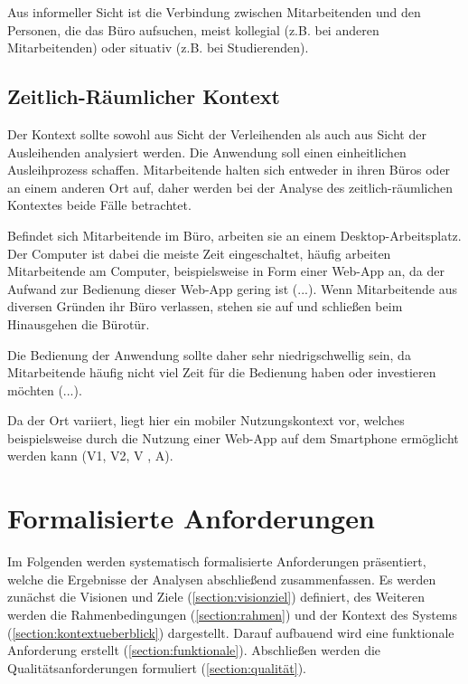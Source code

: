 Aus informeller Sicht ist die Verbindung zwischen Mitarbeitenden und den Personen, die das Büro
aufsuchen, meist kollegial (z.B. bei anderen Mitarbeitenden) oder situativ (z.B. bei Studierenden).

\subsection*{Zeitlich-Räumlicher Kontext}
\label{section:zeit}
Der Kontext sollte sowohl aus Sicht der Verleihenden als auch aus Sicht der Ausleihenden analysiert
werden. Die Anwendung soll einen einheitlichen Ausleihprozess schaffen. Mitarbeitende halten sich
entweder in ihren Büros oder an einem anderen Ort auf, daher werden bei der Analyse des
zeitlich-räumlichen Kontextes beide Fälle betrachtet.

Befindet sich Mitarbeitende im Büro, arbeiten sie an einem Desktop-Arbeitsplatz. Der Computer ist
dabei die meiste Zeit eingeschaltet, häufig arbeiten Mitarbeitende am Computer, beispielsweise in
Form einer Web-App an, da der Aufwand zur Bedienung dieser Web-App gering ist (...). Wenn
Mitarbeitende aus diversen Gründen ihr Büro verlassen, stehen sie auf und schließen beim Hinausgehen
die Bürotür.

Die Bedienung der Anwendung sollte daher sehr niedrigschwellig sein, da Mitarbeitende häufig nicht
viel Zeit für die Bedienung haben oder investieren möchten (...).

Da der Ort variiert, liegt hier ein mobiler Nutzungskontext vor, welches beispielsweise durch die
Nutzung einer Web-App auf dem Smartphone ermöglicht werden kann (V1, V2, V , A).


\section{Formalisierte Anforderungen}
\label{section:anforderung}

Im Folgenden werden systematisch formalisierte Anforderungen präsentiert, welche die Ergebnisse der
Analysen abschließend zusammenfassen. Es werden zunächst die Visionen und Ziele
(\ref{section:visionziel}) definiert, des Weiteren werden die Rahmenbedingungen
(\ref{section:rahmen}) und der Kontext des Systems (\ref{section:kontextueberblick}) dargestellt.
Darauf aufbauend wird eine funktionale Anforderung erstellt (\ref{section:funktionale}). Abschließen
werden die Qualitätsanforderungen formuliert (\ref{section:qualität}).


